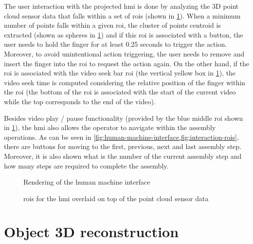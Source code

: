 The user interaction with the projected \gls{hmi} is done by analyzing the 3D point cloud sensor data that falls within a set of \glspl{roi} (shown in \cref{fig:interaction-rois}). When a minimum number of points falls within a given \gls{roi}, the cluster of points centroid is extracted (shown as spheres in \cref{fig:interaction-rois}) and if this \gls{roi} is associated with a button, the user needs to hold the finger for at least 0.25 seconds to trigger the action. Moreover, to avoid unintentional action triggering, the user needs to remove and insert the finger into the \gls{roi} to request the action again. On the other hand, if the \gls{roi} is associated with the video seek bar \gls{roi} (the vertical yellow box in \cref{fig:interaction-rois}), the video seek time is computed considering the relative position of the finger within the \gls{roi} (the bottom of the \gls{roi} is associated with the start of the current video while the top corresponds to the end of the video).

Besides video play / pause functionality (provided by the blue middle \gls{roi} shown in \cref{fig:interaction-rois}), the \gls{hmi} also allows the operator to navigate within the assembly operations. As can be seen in \cref{fig:human-machine-interface,fig:interaction-rois}, there are buttons for moving to the first, previous, next and last assembly step. Moreover, it is also shown what is the number of the current assembly step and how many steps are required to complete the assembly.

\begin{figure}[H]
	\begin{floatrow}[2]
		{\caption{Rendering of the human machine interface}\label{fig:human-machine-interface}}
		{\caption{\glspl{roi} for the \gls{hmi} overlaid on top of the point cloud sensor data}\label{fig:interaction-rois}}
	\end{floatrow}
\end{figure}


\section{Object 3D reconstruction}

